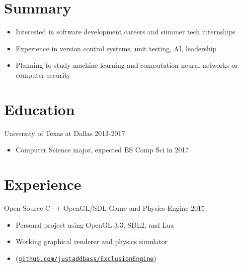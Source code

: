 \documentclass[line,margin]{res}
\begin{document}
	\address{2200 Waterview Pkwy 2031, Richardson, TX 75080}
	\address{(512)574-6609 |
	\href{mailto:rxb132330@utdallas.edu}{rxb132330@utdallas.edu}}

\begin{resume}

\vspace{8pt}
\section{Summary}
\vspace{22pt}
	\begin{itemize} \itemsep -2pt
	\item Interested in software development careers and summer tech internships
	\item Experience in version control systems, unit testing, AI, leadership
	\item Planning to study machine learning and computation neural networks or computer security
	\end{itemize}

\vspace{8pt}
\section{Education}
\vspace{12pt}
University of Texas at Dallas \hfill 2013-2017 \\
\vspace{-12pt}
	\begin{itemize} \itemsep -2pt
	\item Computer Science major, expected BS Comp Sci in 2017
	\end{itemize}

\vspace{8pt}
\section{Experience}
\vspace{12pt}
Open Source C++ OpenGL/SDL Game and Physics Engine
\hfill 2015
	\begin{itemize} \itemsep -2pt
	\item Personal project using OpenGL 3.3, SDL2, and Lua
	\item Working graphical renderer and physics simulator
	\item (\href{https://github.com/justaddbass/ExclusionEngine}{\texttt{github.com/justaddbass/ExclusionEngine}})
	\end{itemize}


\end{resume}
\end{document}
